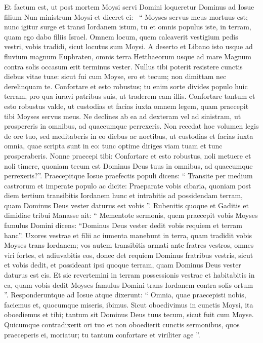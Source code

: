 \begin{biblechapter}
 \verse Et factum est, ut post mortem Moysi servi Domini loqueretur Dominus ad Iosue filium Nun ministrum Moysi et diceret ei: 
 \verse “ Moyses servus meus mortuus est; nunc igitur surge et transi Iordanem istum, tu et omnis populus iste, in terram, quam ego dabo filiis Israel. 
\verse Omnem locum, quem calcaverit vestigium pedis vestri, vobis tradidi, sicut locutus sum Moysi. 
\verse A deserto et Libano isto usque ad fluvium magnum Euphraten, omnis terra Hetthaeorum usque ad mare Magnum contra solis occasum erit terminus vester. 
\verse Nullus tibi poterit resistere cunctis diebus vitae tuae: sicut fui cum Moyse, ero et tecum; non dimittam nec derelinquam te.
 \verse Confortare et esto robustus; tu enim sorte divides populo huic terram, pro qua iuravi patribus suis, ut traderem eam illis. 
\verse Confortare tantum et esto robustus valde, ut custodias et facias iuxta omnem legem, quam praecepit tibi Moyses servus meus. Ne declines ab ea ad dexteram vel ad sinistram, ut prospereris in omnibus, ad quaecumque perrexeris. 
\verse Non recedat hoc volumen legis de ore tuo, sed meditaberis in eo diebus ac noctibus, ut custodias et facias iuxta omnia, quae scripta sunt in eo: tunc optime diriges viam tuam et tunc prosperaberis. 
\verse Nonne praecepi tibi: Confortare et esto robustus, noli metuere et noli timere, quoniam tecum est Dominus Deus tuus in omnibus, ad quaecumque perrexeris?”.
 \verse Praecepitque Iosue praefectis populi dicens: “ Transite per medium castrorum et imperate populo ac dicite: 
\verse Praeparate vobis cibaria, quoniam post diem tertium transibitis Iordanem hunc et intrabitis ad possidendam terram, quam Dominus Deus vester daturus est vobis ”.
 \verse Rubenitis quoque et Gaditis et dimidiae tribui Manasse ait: 
\verse “ Mementote sermonis, quem praecepit vobis Moyses famulus Domini dicens: “Dominus Deus vester dedit vobis requiem et terram hanc”. 
\verse Uxores vestrae et filii ac iumenta manebunt in terra, quam tradidit vobis Moyses trans Iordanem; vos autem transibitis armati ante fratres vestros, omnes viri fortes, et adiuvabitis eos, 
\verse donec det requiem Dominus fratribus vestris, sicut et vobis dedit, et possideant ipsi quoque terram, quam Dominus Deus vester daturus est eis. Et sic revertemini in terram possessionis vestrae et habitabitis in ea, quam vobis dedit Moyses famulus Domini trans Iordanem contra solis ortum ”.
 \verse Responderuntque ad Iosue atque dixerunt: “ Omnia, quae praecepisti nobis, faciemus et, quocumque miseris, ibimus. 
\verse Sicut oboedivimus in cunctis Moysi, ita oboediemus et tibi; tantum sit Dominus Deus tuus tecum, sicut fuit cum Moyse. 
\verse Quicumque contradixerit ori tuo et non oboedierit cunctis sermonibus, quos praeceperis ei, moriatur; tu tantum confortare et viriliter age ”.
 

\end{biblechapter}
